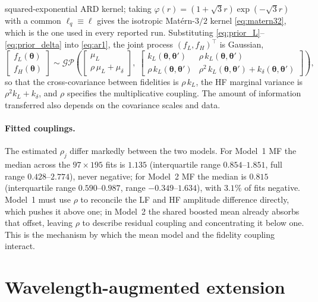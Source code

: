 \documentclass[12pt, letterpaper, oneside]{article}
\begin{document}
squared-exponential ARD kernel; taking
$\varphi(r)=(1+\sqrt3 r)\exp(-\sqrt3 r)$ with a common
$\ell_q\equiv\ell$ gives the isotropic Matérn-$3/2$ kernel
\eqref{eq:matern32}, which is the one used in every reported run. Substituting
\eqref{eq:prior_L}--\eqref{eq:prior_delta} into \eqref{eq:ar1}, the joint
process $(f_L,f_H)^{\top}$ is Gaussian,
\begin{equation}
    \begin{bmatrix} f_L(\bm\theta)\\[2pt] f_H(\bm\theta)\end{bmatrix}
    \sim \mathcal{GP}\!\left(
    \begin{bmatrix} \mu_L \\[2pt] \rho\,\mu_L + \mu_\delta \end{bmatrix},\;
    \begin{bmatrix}
        k_L(\bm\theta,\bm\theta') & \rho\,k_L(\bm\theta,\bm\theta') \\[4pt]
        \rho\,k_L(\bm\theta,\bm\theta') &
        \rho^{2}\,k_L(\bm\theta,\bm\theta') + k_\delta(\bm\theta,\bm\theta')
    \end{bmatrix}
    \right),
    \label{eq:joint}
\end{equation}
so that the cross-covariance between fidelities is $\rho\,k_L$, the HF marginal
variance is $\rho^{2}k_L+k_\delta$, and $\rho$ specifies the multiplicative
coupling. The amount of information transferred also depends on the covariance
scales and data.

\paragraph{Fitted couplings.} The estimated $\rho_j$ differ markedly between
the two models. For Model~1 MF the median across the $97\times195$ fits is
$1.135$ (interquartile range $0.854$--$1.851$, full range $0.428$--$2.774$),
never negative; for Model~2 MF the median is $0.815$ (interquartile range
$0.590$--$0.987$, range $-0.349$--$1.634$), with $3.1\%$ of fits negative.
Model~1 must use $\rho$ to reconcile the LF and HF amplitude difference
directly, which pushes it above one; in Model~2 the shared boosted mean
already absorbs that offset, leaving $\rho$ to describe residual coupling and
concentrating it below one. This is the mechanism by which the mean model and
the fidelity coupling interact.

\section{Wavelength-augmented extension}
\label{subsec:model_augmented}
\end{document}
